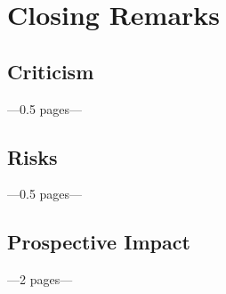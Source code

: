 \chapter{Closing Remarks}
\label{cha:ClosingRemarks}

\section{Criticism}
---0.5 pages---

\section{Risks}
---0.5 pages---

\section{Prospective Impact}
---2 pages---